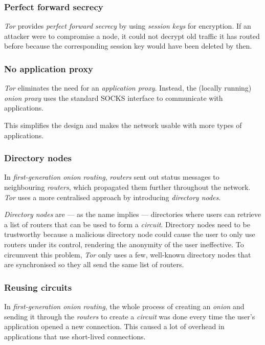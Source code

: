 \documentclass{sig-alternate}
\begin{document}
\subsubsection{Perfect forward secrecy}
\emph{Tor} provides \emph{perfect forward secrecy} by using \emph{session keys} for encryption.
If an attacker were to compromise a node, it could not decrypt old traffic it has routed before
because the corresponding session key would have been deleted by then.

\subsubsection{No application proxy}
\emph{Tor} eliminates the need for an \emph{application proxy}. Instead, the (locally running) 
\emph{onion proxy} uses the standard SOCKS interface to communicate with applications.

This simplifies the design and makes the network usable with more types of applications.

\subsubsection{Directory nodes}
In \emph{first-generation onion routing}, \emph{routers} sent out status messages to neighbouring
\emph{routers}, which propagated them further throughout the network. \emph{Tor} uses
a more centralised approach by introducing \emph{directory nodes}.

\emph{Directory nodes} are --- as the name implies --- directories where users can retrieve a list of
routers that can be used to form a \emph{circuit}. Directory nodes need to be trustworthy because
a malicious directory node could cause the user to only use routers under its control, rendering
the anonymity of the user ineffective. To circumvent this problem, \emph{Tor} only uses a few,
well-known directory nodes that are synchronised so they all send the same list of routers. \cite{tor2004}

\subsubsection{Reusing circuits}
In \emph{first-generation onion routing}, the whole process of creating an \emph{onion} and sending
it through the \emph{routers} to create a \emph{circuit} was done every time the user's application
opened a new connection. This caused a lot of overhead in applications that use short-lived connections.
\end{document}
